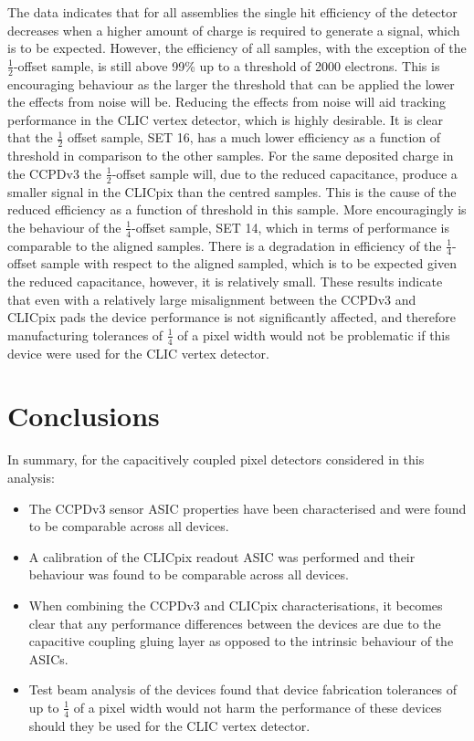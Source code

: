 The data indicates that for all assemblies the single hit efficiency of the detector decreases when a higher amount of charge is required to generate a signal, which is to be expected.  However, the efficiency of all samples, with the exception of the $\frac{1}{2}$-offset sample, is still above 99\% up to a threshold of 2000 electrons.  This is encouraging behaviour as the larger the threshold that can be applied the lower the effects from noise will be.  Reducing the effects from noise will aid tracking performance in the CLIC vertex detector, which is highly desirable.  It is clear that the $\frac{1}{2}$ offset sample, SET 16, has a much lower efficiency as a function of threshold in comparison to the other samples.  For the same deposited charge in the CCPDv3 the $\frac{1}{2}$-offset sample will, due to the reduced capacitance, produce a smaller signal in the CLICpix than the centred samples.  This is the cause of the reduced efficiency as a function of threshold in this sample.  More encouragingly is the behaviour of the $\frac{1}{4}$-offset sample, SET 14, which in terms of performance is comparable to the aligned samples.  There is a degradation in efficiency of the $\frac{1}{4}$-offset sample with respect to the aligned sampled, which is to be expected given the reduced capacitance, however, it is relatively small.  These results indicate that even with a relatively large misalignment between the CCPDv3 and CLICpix pads the device performance is not significantly affected, and therefore manufacturing tolerances of $\frac{1}{4}$ of a pixel width would not be problematic if this device were used for the CLIC vertex detector.


\section{Conclusions}
In summary, for the capacitively coupled pixel detectors considered in this analysis:

\begin{itemize}
\item The CCPDv3 sensor ASIC properties have been characterised and were found to be comparable across all devices.
\item A calibration of the CLICpix readout ASIC was performed and their behaviour was found to be comparable across all devices.  
\item When combining the CCPDv3 and CLICpix characterisations, it becomes clear that any performance differences between the devices are due to the capacitive coupling gluing layer as opposed to the intrinsic behaviour of the ASICs.
\item Test beam analysis of the devices found that device fabrication tolerances of up to $\frac{1}{4}$ of a pixel width would not harm the performance of these devices should they be used for the CLIC vertex detector.  
\end{itemize}

